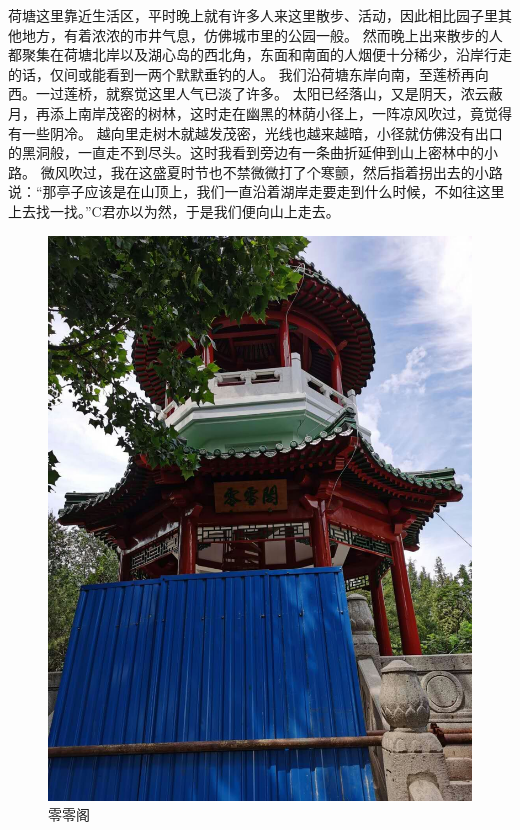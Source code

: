 荷塘这里靠近生活区，平时晚上就有许多人来这里散步、活动，因此相比园子里其他地方，有着浓浓的市井气息，仿佛城市里的公园一般。
然而晚上出来散步的人都聚集在荷塘北岸以及湖心岛的西北角，东面和南面的人烟便十分稀少，沿岸行走的话，仅间或能看到一两个默默垂钓的人。
我们沿荷塘东岸向南，至莲桥再向西。一过莲桥，就察觉这里人气已淡了许多。
太阳已经落山，又是阴天，浓云蔽月，再添上南岸茂密的树林，这时走在幽黑的林荫小径上，一阵凉风吹过，竟觉得有一些阴冷。
越向里走树木就越发茂密，光线也越来越暗，小径就仿佛没有出口的黑洞般，一直走不到尽头。这时我看到旁边有一条曲折延伸到山上密林中的小路。
微风吹过，我在这盛夏时节也不禁微微打了个寒颤，然后指着拐出去的小路说：“那亭子应该是在山顶上，我们一直沿着湖岸走要走到什么时候，不如往这里上去找一找。”C君亦以为然，于是我们便向山上走去。

\begin{figure}[!h]
	\centering
	\includegraphics[width=\linewidth]{figures/零零阁.jpg}
	零零阁
\end{figure}

